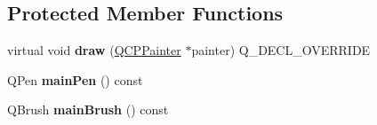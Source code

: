 \subsection*{Protected Member Functions}
\begin{DoxyCompactItemize}
\item 
\mbox{\label{class_q_c_p_item_tracer_a11f187ffea436434f3b5cfc387811967}} 
virtual void {\bfseries draw} (\mbox{\hyperlink{class_q_c_p_painter}{Q\+C\+P\+Painter}} $\ast$painter) Q\+\_\+\+D\+E\+C\+L\+\_\+\+O\+V\+E\+R\+R\+I\+DE
\item 
\mbox{\label{class_q_c_p_item_tracer_abffdcf64d0f84f7b41bd4af07d144642}} 
Q\+Pen {\bfseries main\+Pen} () const
\item 
\mbox{\label{class_q_c_p_item_tracer_a94f81c54197577e86c53a60cf39155cd}} 
Q\+Brush {\bfseries main\+Brush} () const
\end{DoxyCompactItemize}
